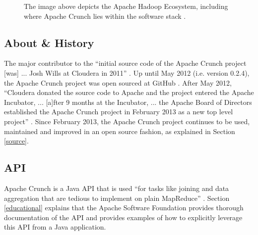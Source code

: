 \documentclass[9pt,twocolumn,twoside]{../../styles/osajnl}
\begin{document}
\begin{figure}[htbp]
\centering
{}
\caption{The image above depicts the Apache Hadoop Ecosystem, including where Apache Crunch lies within the software stack \cite{www-hadoop-ecosystem}.}
\label{fig:hadoop-ecosystem-and-components_3}
\end{figure}

\subsection{About \& History} \label{about}
The major contributor to the ``initial source code of the Apache Crunch project [was] ... Josh Wills at Cloudera in 2011'' \cite{www-crunch-about}. Up until May 2012 (i.e. version 0.2.4), the Apache Crunch project was open sourced at GitHub \cite{www-crunch-about}. After May 2012, ``Cloudera donated the source code to Apache and the project entered the Apache Incubator, ... [a]fter 9 months at the Incubator, ... the Apache Board of Directors established the Apache Crunch project in February 2013 as a new top level project'' \cite{www-crunch-about}. Since February 2013, the Apache Crunch project continues to be used, maintained and improved in an open source fashion, as explained in Section \ref{source}.

\subsection{API} \label{api}
Apache Crunch is a Java API that is used ``for tasks like joining and
data aggregation that are tedious to implement on plain MapReduce''
\cite{www-crunch-api}. Section \ref{educational} explains that the
Apache Software Foundation provides thorough documentation of the API
and provides examples of how to explicitly leverage this API from a
Java application.
\end{document}
